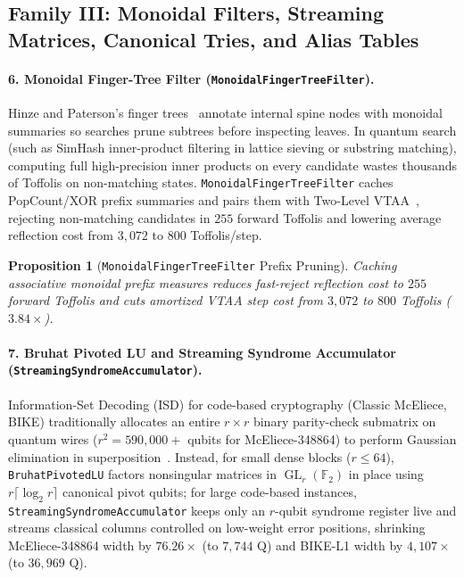 \documentclass[acmsmall,screen,anonymous]{acmart}
\DeclareRobustCommand{\_}{\ifmmode\text{\char95}\else\char95\penalty0\relax\fi}
\theoremstyle{plain}
\newtheorem{proposition}[theorem]{Proposition}
\begin{document}
\subsection{Family III: Monoidal Filters, Streaming Matrices, Canonical Tries, and Alias Tables}
\label{sec:qds_fam3}

\paragraph{6. Monoidal Finger-Tree Filter (\texttt{MonoidalFingerTreeFilter}).}
Hinze and Paterson's finger trees~\cite{hinze2006} annotate internal spine nodes with monoidal summaries so searches prune subtrees before inspecting leaves. In quantum search (such as SimHash inner-product filtering in lattice sieving or substring matching), computing full high-precision inner products on every candidate wastes thousands of Toffolis on non-matching states. \texttt{MonoidalFingerTreeFilter} caches PopCount/XOR prefix summaries and pairs them with Two-Level VTAA~\cite{ambainis2010}, rejecting non-matching candidates in $255$ forward Toffolis and lowering average reflection cost from $3{,}072$ to $800$ Toffolis/step.

\begin{proposition}[\texttt{MonoidalFingerTreeFilter} Prefix Pruning]
\label{prop:p3_6}
Caching associative monoidal prefix measures reduces fast-reject reflection cost to $255$ forward Toffolis and cuts amortized VTAA step cost from $3{,}072$ to $800$ Toffolis ($3.84\times$).
\end{proposition}

\paragraph{7. Bruhat Pivoted LU and Streaming Syndrome Accumulator (\texttt{StreamingSyndrome\allowbreak Accumulator}).}
Information-Set Decoding (ISD) for code-based cryptography (Classic McEliece, BIKE) traditionally allocates an entire $r \times r$ binary parity-check submatrix on quantum wires ($r^2 = 590{,}000+$ qubits for McEliece-348864) to perform Gaussian elimination in superposition~\cite{jaques2020,esser2022}. Instead, for small dense blocks ($r \le 64$), \texttt{BruhatPivotedLU} factors nonsingular matrices in $\operatorname{GL}_r(\mathbb{F}_2)$ in place using $r \lceil \log_2 r \rceil$ canonical pivot qubits; for large code-based instances, \texttt{StreamingSyndrome\allowbreak Accumulator} keeps only an $r$-qubit syndrome register live and streams classical columns controlled on low-weight error positions, shrinking McEliece-348864 width by $76.26\times$ (to $7{,}744\text{ Q}$) and BIKE-L1 width by $4{,}107\times$ (to $36{,}969\text{ Q}$).
\end{document}
